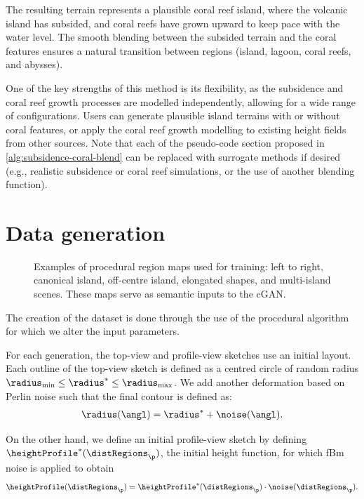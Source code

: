 The resulting terrain represents a plausible coral reef island, where the volcanic island has subsided, and coral reefs have grown upward to keep pace with the water level. The smooth blending between the subsided terrain and the coral features ensures a natural transition between regions (island, lagoon, coral reefs, and abysses).

One of the key strengths of this method is its flexibility, as the subsidence and coral reef growth processes are modelled independently, allowing for a wide range of configurations. Users can generate plausible island terrains with or without coral features, or apply the coral reef growth modelling to existing height fields from other sources. Note that each of the pseudo-code section proposed in \cref{alg:subsidence-coral-blend} can be replaced with surrogate methods if desired (e.g., realistic subsidence or coral reef simulations, or the use of another blending function).


\section{Data generation}
\label{sec:coral-island-dataset-generation}

\begin{figure}
    \caption[Examples of procedural region maps used for training a cGAN]{Examples of procedural region maps used for training: left to right, canonical island, off-centre island, elongated shapes, and multi-island scenes. These maps serve as semantic inputs to the cGAN.}
    \label{fig:coral-island-difficulties-dataset}
\end{figure}

The creation of the dataset is done through the use of the procedural algorithm for which we alter the input parameters.

For each generation, the top-view and profile-view sketches use an initial layout. Each outline of the top-view sketch is defined as a centred circle of random radius $\radius_\text{min} \leq \radius^* \leq \radius_\text{max}$. We add another deformation based on Perlin noise such that the final contour is defined as:
\begin{align*}
    \radius(\angl) = \radius^* + \noise(\angl).
\end{align*}

On the other hand, we define an initial profile-view sketch by defining $\heightProfile^*(\distRegions_\p)$, the initial height function, for which fBm noise is applied to obtain
\begin{align*}
    \heightProfile(\distRegions_\p) = \heightProfile^*(\distRegions_\p) \cdot \noise(\distRegions_\p).
\end{align*}

